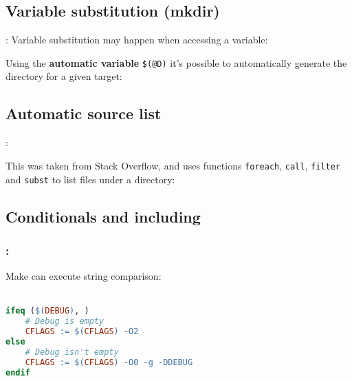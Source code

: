 \subsection{Variable substitution (mkdir)}
\begin{frame}{\secname: \small\subsecname\normalsize}
    Variable substitution may happen when accessing a variable:

    \makeObjsFromSrc

    Using the \textbf{automatic variable} \texttt{\$(@D)} it's possible to automatically generate the directory for a given target:

    \makeDir

\end{frame}


\subsection{Automatic source list}
\begin{frame}{\secname: \small\subsecname\normalsize}

    This was taken from Stack Overflow, and uses functions \texttt{foreach}, \texttt{call}, \texttt{filter} and \texttt{subst} to list files under a directory:

    \makeAutoSrc
\end{frame}


\subsection{Conditionals and including}
\begin{frame}[fragile]
    \frametitle{\secname: \small\subsecname\normalsize}

    Make can execute string comparison: \\~\\

    \begin{lstlisting}[language=make]
ifeq ($(DEBUG), )
    # Debug is empty
    CFLAGS := $(CFLAGS) -O2
else
    # Debug isn't empty
    CFLAGS := $(CFLAGS) -O0 -g -DDEBUG
endif
    \end{lstlisting}
\end{frame}

